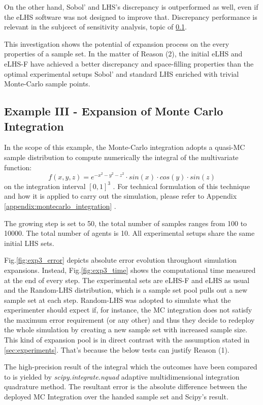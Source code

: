 \documentclass[12pt]{extarticle}
\newcommand{\mfigref}[1]{Fig.\ref{#1}}
\newcommand{\mappendixref}[1]{Appendix \ref{#1}}
\begin{document}
On the other hand, Sobol' and LHS's discrepancy is outperformed as well, even if the eLHS software was not designed to improve that. Discrepancy performance is relevant in the subjcect of sensitivity analysis, topic of \cref{subsec:exp3}.

This investigation shows the potential of expansion process on the every properties of a sample set. In the matter of Reason (2), the initial eLHS and eLHS-F have achieved a better discrepancy and space-filling properties than the optimal experimental setups Sobol' and standard LHS enriched with trivial Monte-Carlo sample points.


\subsection{Example III - Expansion of Monte Carlo Integration}
\label{subsec:exp3}
In the scope of this example, the Monte-Carlo integration adopts a quasi-MC sample distribution to compute numerically the integral of the multivariate function:
\begin{equation*}
f(x,y,z) = e^{-x^2-y^2-z^2} \cdot sin(x) \cdot cos(y) \cdot sin(z)
\end{equation*}
on the integration interval $[0, 1]^3$ .
For technical formulation of this technique and how it is applied to carry out the simulation, please refer to \mappendixref{appendix:montecarlo_integration} .

The growing step is set to 50, the total number of samples ranges from 100 to 10000. The total number of agents is 10. 
All experimental setups share the same initial LHS sets.

\mfigref{fig:exp3_error} depicts absolute error evolution throughout simulation expansions. Instead, \mfigref{fig:exp3_time} shows the computational time measured at the end of every step. The experimental sets are eLHS-F and eLHS as usual and the Random-LHS distribution, which is a sample set pool pulls out a new sample set at each step. Random-LHS was adopted to simulate what the experimenter should expect if, for instance, the MC integration does not satisfy the maximum error requirement (or any other) and thus they decide to redeploy the whole simulation by creating a new sample set with increased sample size. This kind of expansion pool is in direct contrast with the assumption stated in \cref{sec:experiments}. That's because the below tests can justify Reason (1). 

The high-precision result of the integral which the outcomes have been compared to is yielded by \emph{scipy.integrate.nquad} adaptive multidimensional integration quadrature method. The resultant error is the absolute difference between the deployed MC Integration over the handed sample set and Scipy's result.
\end{document}
